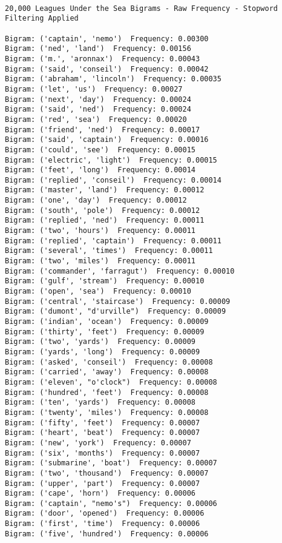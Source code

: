 \documentclass[11pt]{article}
\begin{document}
    \begin{Verbatim}[commandchars=\\\{\}]

20,000 Leagues Under the Sea Bigrams - Raw Frequency - Stopword Filtering Applied 

Bigram: ('captain', 'nemo')  Frequency: 0.00300
Bigram: ('ned', 'land')  Frequency: 0.00156
Bigram: ('m.', 'aronnax')  Frequency: 0.00043
Bigram: ('said', 'conseil')  Frequency: 0.00042
Bigram: ('abraham', 'lincoln')  Frequency: 0.00035
Bigram: ('let', 'us')  Frequency: 0.00027
Bigram: ('next', 'day')  Frequency: 0.00024
Bigram: ('said', 'ned')  Frequency: 0.00024
Bigram: ('red', 'sea')  Frequency: 0.00020
Bigram: ('friend', 'ned')  Frequency: 0.00017
Bigram: ('said', 'captain')  Frequency: 0.00016
Bigram: ('could', 'see')  Frequency: 0.00015
Bigram: ('electric', 'light')  Frequency: 0.00015
Bigram: ('feet', 'long')  Frequency: 0.00014
Bigram: ('replied', 'conseil')  Frequency: 0.00014
Bigram: ('master', 'land')  Frequency: 0.00012
Bigram: ('one', 'day')  Frequency: 0.00012
Bigram: ('south', 'pole')  Frequency: 0.00012
Bigram: ('replied', 'ned')  Frequency: 0.00011
Bigram: ('two', 'hours')  Frequency: 0.00011
Bigram: ('replied', 'captain')  Frequency: 0.00011
Bigram: ('several', 'times')  Frequency: 0.00011
Bigram: ('two', 'miles')  Frequency: 0.00011
Bigram: ('commander', 'farragut')  Frequency: 0.00010
Bigram: ('gulf', 'stream')  Frequency: 0.00010
Bigram: ('open', 'sea')  Frequency: 0.00010
Bigram: ('central', 'staircase')  Frequency: 0.00009
Bigram: ('dumont', "d'urville")  Frequency: 0.00009
Bigram: ('indian', 'ocean')  Frequency: 0.00009
Bigram: ('thirty', 'feet')  Frequency: 0.00009
Bigram: ('two', 'yards')  Frequency: 0.00009
Bigram: ('yards', 'long')  Frequency: 0.00009
Bigram: ('asked', 'conseil')  Frequency: 0.00008
Bigram: ('carried', 'away')  Frequency: 0.00008
Bigram: ('eleven', "o'clock")  Frequency: 0.00008
Bigram: ('hundred', 'feet')  Frequency: 0.00008
Bigram: ('ten', 'yards')  Frequency: 0.00008
Bigram: ('twenty', 'miles')  Frequency: 0.00008
Bigram: ('fifty', 'feet')  Frequency: 0.00007
Bigram: ('heart', 'beat')  Frequency: 0.00007
Bigram: ('new', 'york')  Frequency: 0.00007
Bigram: ('six', 'months')  Frequency: 0.00007
Bigram: ('submarine', 'boat')  Frequency: 0.00007
Bigram: ('two', 'thousand')  Frequency: 0.00007
Bigram: ('upper', 'part')  Frequency: 0.00007
Bigram: ('cape', 'horn')  Frequency: 0.00006
Bigram: ('captain', "nemo's")  Frequency: 0.00006
Bigram: ('door', 'opened')  Frequency: 0.00006
Bigram: ('first', 'time')  Frequency: 0.00006
Bigram: ('five', 'hundred')  Frequency: 0.00006

    \end{Verbatim}
\end{document}
